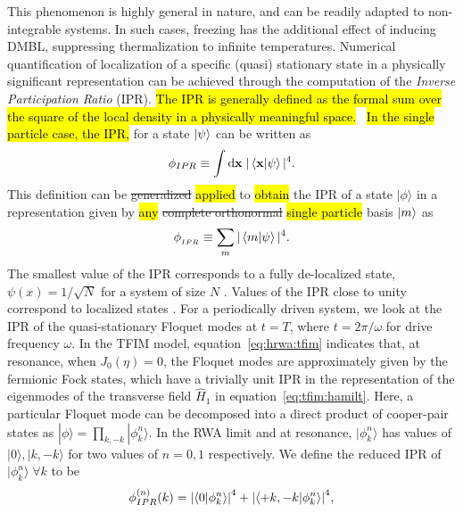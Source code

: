 \documentclass[%
reprint,
superscriptaddress,
linenumbers,
amsmath,amssymb,
aps,
prb,
showkeys,
]{revtex4-2}
\begin{document}
	This phenomenon is highly general in nature, and can be readily adapted to non-integrable systems. In such cases, freezing has the additional effect of inducing DMBL, suppressing thermalization to infinite temperatures. Numerical quantification of localization of a specific (quasi) stationary state in a physically significant representation can be achieved through the computation of the \emph{Inverse Participation Ratio} (IPR).  \hl{The IPR is generally defined as the formal sum over the square of the local density in a physically meaningful space.}~\cite{mukherjee_modulation-assisted_2015,lin_many-body_2018,murphy_generalized_2011, torres-herrera_self-averaging_2020} \hl{In the single particle case,  the IPR, } for a state $\ket{\psi}$ can be written as
	\begin{equation*}
		\phi_{IPR}\equiv \int \mathrm{d}\mathbf{x}\;\vert\ip{\mathbf{x}}{\psi}\vert^4.
	\end{equation*}
	This definition can be \st{generalized} \hl{applied} to \hl{obtain} the IPR of a state $|\phi\rangle$ in a representation given by \hl{any} \st{complete orthonormal} \hl{single particle} basis $\ket{m}$ as 
	\begin{equation}
	\label{eq:ipr:defn}
	\phi_{{_{IPR}}} \equiv \sum_m\vert\ip{m}{\psi}\vert^4.
	\end{equation}
	The smallest value of the IPR corresponds to a fully de-localized state, $\psi(x)=1/\sqrt{N}$ for a system of size $N$ \cite{torres-herrera_self-averaging_2020,trivedi_can_2005}. Values of the IPR close to unity correspond to localized states \cite{misguich_inverse_2016}. For a periodically driven system, we look at the IPR of the quasi-stationary Floquet modes at $t=T$, where $t=2\pi/\omega$ for drive frequency $\omega$. In the TFIM model, equation~\ref{eq:hrwa:tfim} indicates that, at resonance, when $J_0(\eta)=0$, the Floquet modes are approximately given by the fermionic Fock states, which have a trivially unit IPR in the representation of the eigenmodes of the transverse field $\hat{H}_1$ in equation~\ref{eq:tfim:hamilt}. Here, a particular Floquet mode can be decomposed into a direct product of cooper-pair states as $|\phi\rangle = \prod_{k,-k}|\phi^n_k\rangle$. In the RWA limit and at resonance, $|\phi^n_k\rangle$ has values of $|0\rangle, |k,-k\rangle$ for two values of $n=0,1$ respectively. We define the reduced IPR of $|\phi^n_k\rangle\; \forall k$ to be
	\begin{equation}
	\label{eq:ipr:ising}
	\phi^{(n)}_{IPR}(k) = \abs{\ip{0}{\phi^n_k}}^4 + \abs{\ip{ +k, -k }{\phi^n_k}}^4,
	\end{equation}
\end{document}
